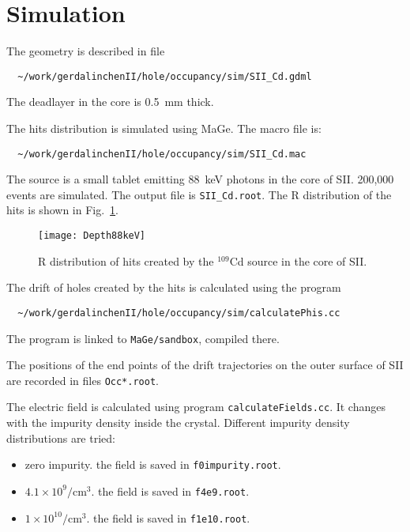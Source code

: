 \documentclass[12pt, a4paper]{article}
\begin{document}
\section{Simulation}
\label{s:sim}
The geometry is described in file 
\begin{lstlisting}
  ~/work/gerdalinchenII/hole/occupancy/sim/SII_Cd.gdml
\end{lstlisting}
The deadlayer in the core is 0.5~mm thick.

The hits distribution is simulated using MaGe. The macro file is:
\begin{lstlisting}
  ~/work/gerdalinchenII/hole/occupancy/sim/SII_Cd.mac
\end{lstlisting}
The source is a small tablet emitting 88~keV photons in the core of
SII. 200,000 events are simulated. The output file is
\lstinline!SII_Cd.root!. The R distribution of the hits is shown in Fig.~\ref{f:dep}.
\begin{figure}[fptb]
  \centering
  \texttt{[image: Depth88keV]}
  \caption{R distribution of hits created by the $^109$Cd source in
    the core of SII.}
  \label{f:dep}
\end{figure}

The drift of holes created by the hits is calculated using the program
\begin{lstlisting}
  ~/work/gerdalinchenII/hole/occupancy/sim/calculatePhis.cc
\end{lstlisting}
The program is linked to \lstinline!MaGe/sandbox!, compiled there.

The positions of the end points of the drift trajectories on the outer
surface of SII are recorded in files \lstinline!Occ*.root!.

The electric field is calculated using program
\lstinline!calculateFields.cc!. It changes with the impurity density
inside the crystal. Different impurity density distributions are
tried:
\begin{itemize}
\item zero impurity. the field is saved in
  \lstinline!f0impurity.root!.
\item $4.1 \times 10^{9}/$cm$^{3}$. the field is saved in
  \lstinline!f4e9.root!.
\item $1 \times 10^{10}/$cm$^{3}$. the field is saved in
  \lstinline!f1e10.root!.
\end{itemize}
\end{document}
